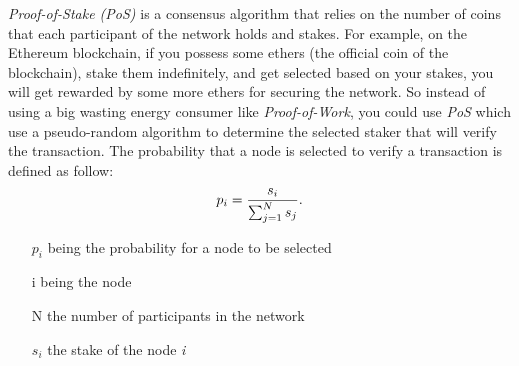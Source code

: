 \documentclass{ifacconf}
\begin{document}
\textit{Proof-of-Stake (PoS)} is a consensus algorithm that relies on the number of coins that each participant of the network holds and stakes. For example, on the Ethereum blockchain, if you possess some ethers (the official coin of the blockchain), stake them indefinitely, and get selected based on your stakes, you will get rewarded by some more ethers for securing the network. So instead of using a big wasting energy consumer like \textit{Proof-of-Work}, you could use \textit{PoS} which use a pseudo-random algorithm to determine the selected staker that will verify the transaction. The probability that a node is selected to verify a transaction is defined as follow:
\begin{equation} \label{eq:sample}
{p_{i}} = {{s_{i}}\over {\sum_{j=1}^{N} s_{j}}}.
\end{equation}
\begin{itemize}
    \item[$p_{i}$] being the probability for a node to be selected
    \item[i] being the node
    \item[N] the number of participants in the network
    \item[$s_{i}$] the stake of the node \textit{i}
\end{itemize}






\end{document}
